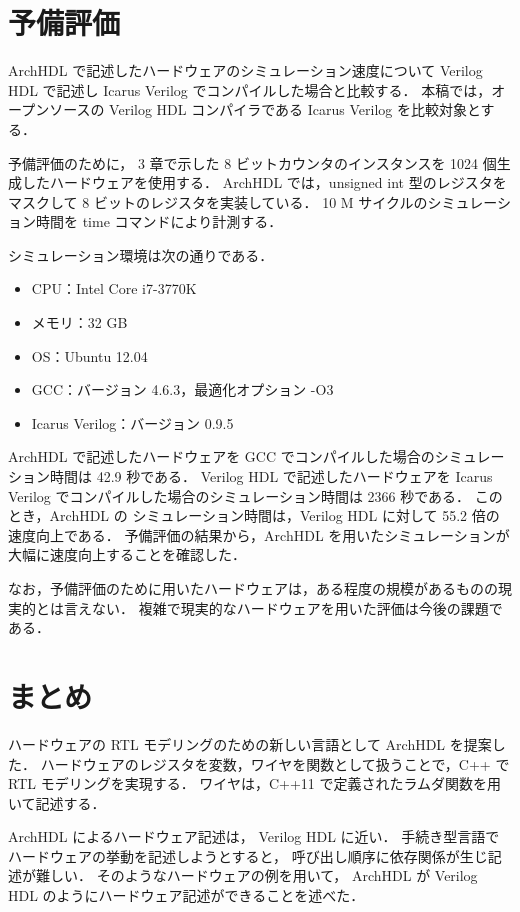 \documentclass[submit,techreq,noauthor]{ipsj}
\begin{document}
\section{予備評価}
ArchHDL で記述したハードウェアのシミュレーション速度について
Verilog HDL で記述し Icarus Verilog\cite{iverilog} でコンパイルした場合と比較する．
本稿では，オープンソースの Verilog HDL コンパイラである Icarus Verilog を比較対象とする．

予備評価のために，
3 章で示した 8 ビットカウンタのインスタンスを 1024 個生成したハードウェアを使用する．
ArchHDL では，unsigned int 型のレジスタをマスクして 8 ビットのレジスタを実装している．
10 M サイクルのシミュレーション時間を time コマンドにより計測する．

シミュレーション環境は次の通りである．
\begin{itemize}
 \item CPU：Intel Core i7-3770K
 \item メモリ：32 GB
 \item OS：Ubuntu 12.04
 \item GCC：バージョン 4.6.3，最適化オプション -O3
 \item Icarus Verilog：バージョン 0.9.5
\end{itemize}

ArchHDL で記述したハードウェアを GCC でコンパイルした場合のシミュレーション時間は 42.9 秒である．
Verilog HDL で記述したハードウェアを Icarus Verilog でコンパイルした場合のシミュレーション時間は 2366 秒である．
このとき，ArchHDL の シミュレーション時間は，Verilog HDL に対して 55.2 倍の速度向上である．
予備評価の結果から，ArchHDL を用いたシミュレーションが大幅に速度向上することを確認した．

なお，予備評価のために用いたハードウェアは，ある程度の規模があるものの現実的とは言えない．
複雑で現実的なハードウェアを用いた評価は今後の課題である．

\section{まとめ}
ハードウェアの RTL モデリングのための新しい言語として ArchHDL を提案した．
ハードウェアのレジスタを変数，ワイヤを関数として扱うことで，C++ で RTL モデリングを実現する．
ワイヤは，C++11 で定義されたラムダ関数を用いて記述する．

ArchHDL によるハードウェア記述は， Verilog HDL に近い．
手続き型言語でハードウェアの挙動を記述しようとすると，
呼び出し順序に依存関係が生じ記述が難しい．
そのようなハードウェアの例を用いて，
ArchHDL が Verilog HDL のようにハードウェア記述ができることを述べた．
\end{document}
